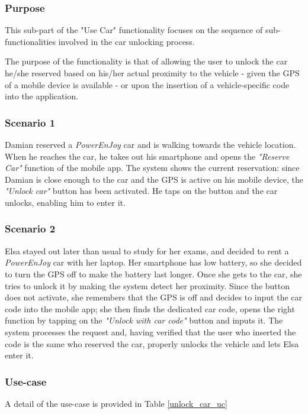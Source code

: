 \subsubsection{Purpose}
This sub-part of the "Use Car" functionality focuses on the sequence of sub-functionalities involved in the car unlocking process.

The purpose of the functionality is that of allowing the user to unlock the car he/she reserved based on his/her actual proximity to the vehicle - given the GPS of a mobile device is available - or upon the insertion of a vehicle-specific code into the application.

\subsubsection{Scenario 1}
Damian reserved a \emph{PowerEnJoy} car and is walking towards the vehicle location. When he reaches the car, he takes out his smartphone and opens the \emph{"Reserve Car"} function of the mobile app. The system shows the current reservation: since Damian is close enough to the car and the GPS is active on his mobile device, the \emph{"Unlock car"} button has been activated. He taps on the button and the car unlocks, enabling him to enter it.

\subsubsection{Scenario 2}
Elsa stayed out later than usual to study for her exams, and decided to rent a \emph{PowerEnJoy} car with her laptop. Her smartphone has low battery, so she decided to turn the GPS off to make the battery last longer. Once she gets to the car, she tries to unlock it by making the system detect her proximity. Since the button does not activate, she remembers that the GPS is off and decides to input the car code into the mobile app; she then finds the dedicated car code, opens the right function by tapping on the \emph{"Unlock with car code"} button and inputs it. The system processes the request and, having verified that the user who inserted the code is the same who reserved the car, properly unlocks the vehicle and lets Elsa enter it.

\subsubsection{Use-case}
A detail of the use-case is provided in Table \ref{unlock_car_uc}

